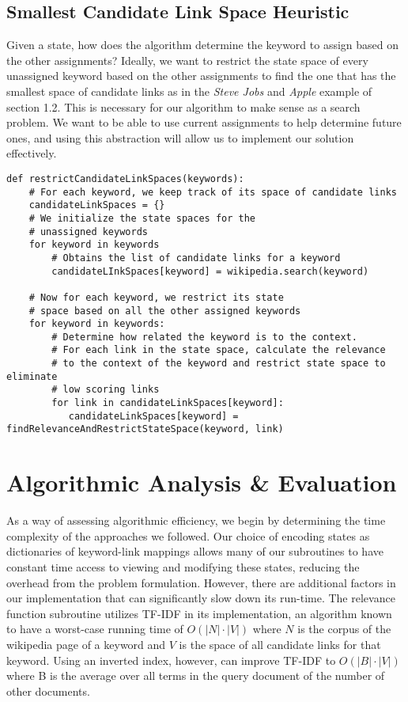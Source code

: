 \documentclass[twoside,11pt]{article}
\begin{document}
\subsection{Smallest Candidate Link Space Heuristic}

Given a state, how does the algorithm determine the keyword to assign based on the other assignments? Ideally, we want to restrict the state space of every unassigned keyword based on the other assignments to find the one that has the smallest space of candidate links as in the \textit{Steve Jobs} and \textit{Apple} example of section 1.2. This is necessary for our algorithm to make sense as a search problem. We want to be able to use current assignments to help determine future ones, and using this abstraction will allow us to implement our solution effectively.

\begin{lstlisting}
def restrictCandidateLinkSpaces(keywords):
    # For each keyword, we keep track of its space of candidate links
    candidateLinkSpaces = {}
    # We initialize the state spaces for the
    # unassigned keywords
    for keyword in keywords
        # Obtains the list of candidate links for a keyword
        candidateLInkSpaces[keyword] = wikipedia.search(keyword)

    # Now for each keyword, we restrict its state
    # space based on all the other assigned keywords
    for keyword in keywords:
        # Determine how related the keyword is to the context.
        # For each link in the state space, calculate the relevance
        # to the context of the keyword and restrict state space to eliminate
        # low scoring links
        for link in candidateLinkSpaces[keyword]:
           candidateLinkSpaces[keyword] =  findRelevanceAndRestrictStateSpace(keyword, link)

\end{lstlisting}



\section{Algorithmic Analysis \& Evaluation}

As a way of assessing algorithmic efficiency, we begin by determining the time complexity of the approaches we followed. Our  choice of encoding states as dictionaries of keyword-link mappings allows many of our subroutines to have constant time access to viewing and modifying these states, reducing the overhead from the problem formulation. However, there are additional factors in our implementation that can significantly slow down its run-time. The relevance function subroutine utilizes TF-IDF in its implementation, an algorithm known to have a worst-case running time of $O(|N|\cdot|V|)$ where $N$ is the corpus of the wikipedia page of a keyword and $V$ is the space of all candidate links for that keyword. Using an inverted index, however, can improve TF-IDF to $O(|B|\cdot|V|)$ where B is the average over all terms in the query document of the number of other documents.
\end{document}
